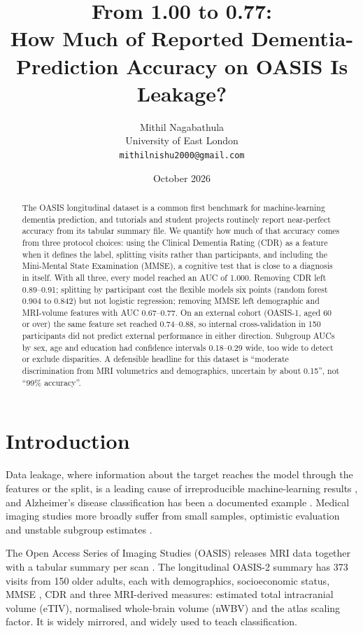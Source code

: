 \documentclass[11pt]{article}
\title{From 1.00 to 0.77:\\
\large How Much of Reported Dementia-Prediction Accuracy on OASIS Is Leakage?}
\author{Mithil Nagabathula\\University of East London\\\texttt{mithilnishu2000@gmail.com}}
\date{October 2026}
\begin{document}
\maketitle
\sloppy

\begin{abstract}
The OASIS longitudinal dataset is a common first benchmark for machine-learning dementia prediction, and tutorials and student projects
routinely report near-perfect accuracy from its tabular summary file. We quantify how much of that accuracy comes from three
protocol choices: using the Clinical Dementia Rating (CDR) as a feature when it defines the label, splitting visits rather than
participants, and including the Mini-Mental State Examination (MMSE), a cognitive test that is close to a diagnosis in itself. With
all three, every model reached an AUC of 1.000. Removing CDR left 0.89--0.91; splitting by participant cost the flexible models six
points (random forest 0.904 to 0.842) but not logistic regression; removing MMSE left demographic and MRI-volume features with AUC
0.67--0.77. On an external cohort (OASIS-1, aged 60 or over) the same feature set reached 0.74--0.88, so internal cross-validation in
150 participants did not predict external performance in either direction. Subgroup AUCs by sex, age and education had confidence
intervals 0.18--0.29 wide, too wide to detect or exclude disparities. A defensible headline for this dataset is ``moderate
discrimination from MRI volumetrics and demographics, uncertain by about 0.15'', not ``99\% accuracy''.
\end{abstract}

\section{Introduction}
Data leakage, where information about the target reaches the model through the features or the split, is a leading cause of
irreproducible machine-learning results \cite{kapoor2023leakage}, and Alzheimer's disease classification has been a documented
example \cite{wen2020ad}. Medical imaging studies more broadly suffer from small samples, optimistic evaluation and unstable subgroup
estimates \cite{varoquaux2022failures}.

The Open Access Series of Imaging Studies (OASIS) releases MRI data together with a tabular summary per scan
\cite{marcus2007oasis,marcus2010oasis2}. The longitudinal OASIS-2 summary has 373 visits from 150 older adults, each with demographics,
socioeconomic status, MMSE \cite{folstein1975mmse}, CDR \cite{morris1993cdr} and three MRI-derived measures: estimated total
intracranial volume (eTIV), normalised whole-brain volume (nWBV) and the atlas scaling factor. It is widely mirrored, and widely used to
teach classification.
\end{document}

